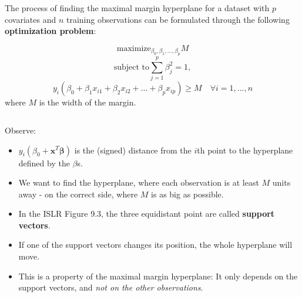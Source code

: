 \documentclass[10pt,ignorenonframetext,]{beamer}
\providecommand{\tightlist}{%
  \setlength{\itemsep}{0pt}\setlength{\parskip}{0pt}}
\begin{document}
\begin{frame}

The process of finding the maximal margin hyperplane for a dataset with
\(p\) covariates and \(n\) training observations can be formulated
through the following \textbf{optimization problem}:

\[\mathrm{maximize}_{\beta_0,\beta_1,...,\beta_p}  M \]
\[\text{subject to} \sum_{j=1}^p \beta_j^2=1,\]
\[y_i(\beta_0+\beta_1 x_{i1}+\beta_2 x_{i2}+...+\beta_p x_{ip})\geq M \quad  \forall i=1,...,n\]
where \(M\) is the width of the margin.

\(~\)

Observe: \vspace{-2mm}

\begin{itemize}
\tightlist
\item
  \(y_i(\beta_0+{\boldsymbol x}^T {\boldsymbol \beta})\) is the (signed)
  distance from the \(i\)th point to the hyperplane defined by the
  \(\beta\)s.
\item
  We want to find the hyperplane, where each observation is at least
  \(M\) units away - on the correct side, where \(M\) is as big as
  possible.
\end{itemize}

\end{frame}

\begin{frame}

\begin{itemize}
\item
  In the ISLR Figure 9.3, the three equidistant point are called
  \textbf{support vectors}.
\item
  If one of the support vectors changes its position, the whole
  hyperplane will move.
\item
  This is a property of the maximal margin hyperplane: It only depends
  on the support vectors, and \emph{not on the other observations}.
\end{itemize}

\end{frame}
\end{document}
